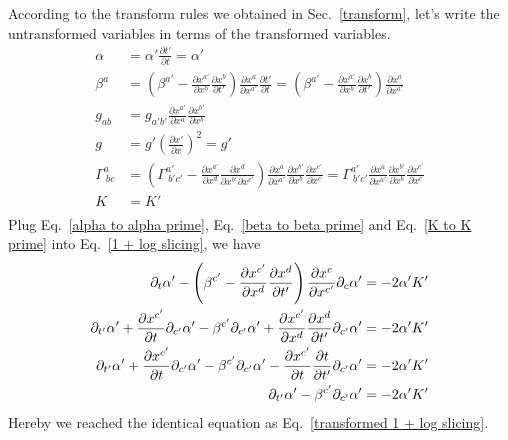 \documentclass[letterpaper,nofootinbib,prd,amsmath,onecolumn]{revtex4-1}
\begin{document}
According to the transform rules we obtained in Sec.~\ref{transform}, let's write the untransformed variables in terms of the transformed variables. 
\begin{align}
\alpha & = \alpha'\frac{\partial t'}{\partial t} = \alpha'\label{alpha to alpha prime}\\
\beta^{a} & = \left(\beta^{a'} - \frac{\partial x^{a'}}{\partial x^{b}}\frac{\partial x^{b}}{\partial t'}\right)\frac{\partial x^{a}}{\partial x^{a'}}\frac{\partial t'}{\partial t} =   \left(\beta^{a'} - \frac{\partial x^{a'}}{\partial x^{b}}\frac{\partial x^{b}}{\partial t'}\right)\frac{\partial x^{a}}{\partial x^{a'}}\label{beta to beta prime}\\
g_{ab} & = g_{a'b'}\frac{\partial x^{a'}}{\partial x^{a}}\frac{\partial x^{b'}}{\partial x^{b}}\label{metric to metric prime}\\
g & = g'\left(\frac{\partial x'}{\partial x}\right)^{2} = g'\label{det to det prime}\\
\Gamma^{a}_{~bc} & = \left(\Gamma^{a'}_{~b'c'} - \frac{\partial x^{a'}}{\partial x^{d}}\frac{\partial x^{d}}{\partial x^{b'}\partial x^{c'}}\right)\frac{\partial x^{a}}{\partial x^{a'}}\frac{\partial x^{b'}}{\partial x^{b}}\frac{\partial x^{c'}}{\partial x^{c}} = \Gamma^{a'}_{~b'c'}\frac{\partial x^{a}}{\partial x^{a'}}\frac{\partial x^{b'}}{\partial x^{b}}\frac{\partial x^{c'}}{\partial x^{c}}\label{gamma to gamma prime}\\
K & = K'\label{K to K prime}\\
\end{align}
Plug Eq.~\ref{alpha to alpha prime}, Eq.~\ref{beta to beta prime} and Eq.~\ref{K to K prime} into Eq.~\ref{1 + log slicing}, we have
\begin{align}
\partial_{t}\alpha' - \left(\beta^{c'} - \frac{\partial x^{c'}}{\partial x^{d}}\frac{\partial x^{d}}{\partial t'}\right)\frac{\partial x^{c}}{\partial x^{c'}}\partial_{c}\alpha' & = -2\alpha' K'\notag\\
\partial_{t'}\alpha' + \frac{\partial x^{c'}}{\partial t}\partial_{c'}\alpha' - \beta^{c'}\partial_{c'}\alpha' + \frac{\partial x^{c'}}{\partial x^{d}}\frac{\partial x^{d}}{\partial t'}\partial_{c'}\alpha' & = -2\alpha' K'\notag\\
\partial_{t'}\alpha' + \frac{\partial x^{c'}}{\partial t}\partial_{c'}\alpha' - \beta^{c'}\partial_{c'}\alpha' - \frac{\partial x^{c'}}{\partial t}\frac{\partial t}{\partial t'}\partial_{c'}\alpha' & = -2\alpha' K'\notag\\
\partial_{t'}\alpha'  - \beta^{c'}\partial_{c'}\alpha' & = -2\alpha' K'
\end{align}
Hereby we reached the identical equation as Eq.~\ref{transformed 1 + log slicing}.
\end{document}
